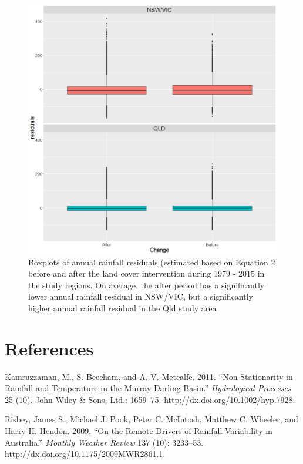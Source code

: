 \documentclass[fleqn,10pt,lineno]{wlpeerj} %
\theoremstyle{definition}
\theoremstyle{definition}
\theoremstyle{definition}
\theoremstyle{remark}
\begin{document}
\begin{figure}
\includegraphics[width=0.7\linewidth]{figures/ResidualBoxplotchange} \caption{Boxplots of annual rainfall residuals (estimated based on Equation 2 before and after the land cover intervention during 1979 - 2015 in the study regions. On average, the after period has a significantly lower annual rainfall residual in NSW/VIC, but a significantly higher annual rainfall residual in the Qld study area}\label{fig:meandiff}
\end{figure}

\section*{References}\label{references}

\hypertarget{refs}{}
\hypertarget{ref-Kamruzzaman2011}{}
Kamruzzaman, M., S. Beecham, and A. V. Metcalfe. 2011.
``Non-Stationarity in Rainfall and Temperature in the Murray Darling
Basin.'' \emph{Hydrological Processes} 25 (10). John Wiley \& Sons,
Ltd.: 1659--75. \url{http://dx.doi.org/10.1002/hyp.7928}.

\hypertarget{ref-Risbey2009}{}
Risbey, James S., Michael J. Pook, Peter C. McIntosh, Matthew C.
Wheeler, and Harry H. Hendon. 2009. ``On the Remote Drivers of Rainfall
Variability in Australia.'' \emph{Monthly Weather Review} 137 (10):
3233--53. \url{http://dx.doi.org/10.1175/2009MWR2861.1}.
\end{document}
